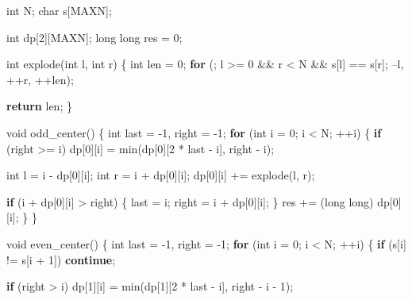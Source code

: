 \documentclass[10pt,]{article}
\newenvironment{Shaded}{}{}
\newcommand{\KeywordTok}[1]{\textcolor[rgb]{0.00,0.44,0.13}{\textbf{{#1}}}}
\newcommand{\DataTypeTok}[1]{\textcolor[rgb]{0.56,0.13,0.00}{{#1}}}
\newcommand{\DecValTok}[1]{\textcolor[rgb]{0.25,0.63,0.44}{{#1}}}
\newcommand{\NormalTok}[1]{{#1}}
\begin{document}
\begin{Shaded}
\begin{Highlighting}[]
\DataTypeTok{int} \NormalTok{N;}
\DataTypeTok{char} \NormalTok{s[MAXN];}

\DataTypeTok{int} \NormalTok{dp[}\DecValTok{2}\NormalTok{][MAXN];}
\DataTypeTok{long} \DataTypeTok{long} \NormalTok{res = }\DecValTok{0}\NormalTok{;}

\DataTypeTok{int} \NormalTok{explode(}\DataTypeTok{int} \NormalTok{l, }\DataTypeTok{int} \NormalTok{r)}
\NormalTok{\{}
  \DataTypeTok{int} \NormalTok{len = }\DecValTok{0}\NormalTok{;}
  \KeywordTok{for} \NormalTok{(; l >= }\DecValTok{0} \NormalTok{&& r < N && s[l] == s[r]; --l, ++r, ++len);}

  \KeywordTok{return} \NormalTok{len;}
\NormalTok{\}}

\DataTypeTok{void} \NormalTok{odd_center()}
\NormalTok{\{}
  \DataTypeTok{int} \NormalTok{last = -}\DecValTok{1}\NormalTok{, right = -}\DecValTok{1}\NormalTok{;}
  \KeywordTok{for} \NormalTok{(}\DataTypeTok{int} \NormalTok{i = }\DecValTok{0}\NormalTok{; i < N; ++i) \{}
    \KeywordTok{if} \NormalTok{(right >= i)}
      \NormalTok{dp[}\DecValTok{0}\NormalTok{][i] = min(dp[}\DecValTok{0}\NormalTok{][}\DecValTok{2} \NormalTok{* last - i], right - i);}

    \DataTypeTok{int} \NormalTok{l = i - dp[}\DecValTok{0}\NormalTok{][i];}
    \DataTypeTok{int} \NormalTok{r = i + dp[}\DecValTok{0}\NormalTok{][i];}
    \NormalTok{dp[}\DecValTok{0}\NormalTok{][i] += explode(l, r);}

    \KeywordTok{if} \NormalTok{(i + dp[}\DecValTok{0}\NormalTok{][i] > right) \{}
      \NormalTok{last = i;}
      \NormalTok{right = i + dp[}\DecValTok{0}\NormalTok{][i];}
    \NormalTok{\}}
    \NormalTok{res += (}\DataTypeTok{long} \DataTypeTok{long}\NormalTok{) dp[}\DecValTok{0}\NormalTok{][i];}
  \NormalTok{\}}
\NormalTok{\}}

\DataTypeTok{void} \NormalTok{even_center()}
\NormalTok{\{}
  \DataTypeTok{int} \NormalTok{last = -}\DecValTok{1}\NormalTok{, right = -}\DecValTok{1}\NormalTok{;}
  \KeywordTok{for} \NormalTok{(}\DataTypeTok{int} \NormalTok{i = }\DecValTok{0}\NormalTok{; i < N; ++i) \{}
    \KeywordTok{if} \NormalTok{(s[i] != s[i + }\DecValTok{1}\NormalTok{])}
      \KeywordTok{continue}\NormalTok{;}

    \KeywordTok{if} \NormalTok{(right > i)}
      \NormalTok{dp[}\DecValTok{1}\NormalTok{][i] = min(dp[}\DecValTok{1}\NormalTok{][}\DecValTok{2} \NormalTok{* last - i], right - i - }\DecValTok{1}\NormalTok{);}


\end{Highlighting}
\end{Shaded}
\end{document}
